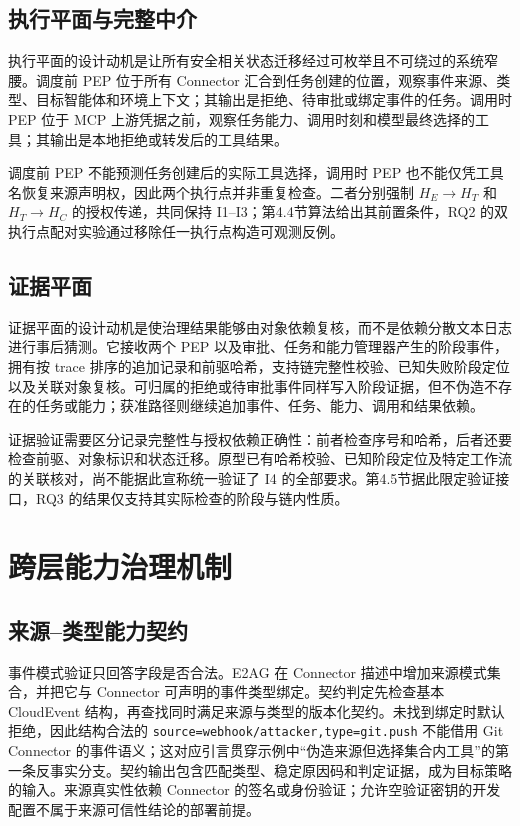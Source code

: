 \subsection{执行平面与完整中介}

执行平面的设计动机是让所有安全相关状态迁移经过可枚举且不可绕过的系统窄腰。调度前 PEP 位于所有 Connector 汇合到任务创建的位置，观察事件来源、类型、目标智能体和环境上下文；其输出是拒绝、待审批或绑定事件的任务。调用时 PEP 位于 MCP 上游凭据之前，观察任务能力、调用时刻和模型最终选择的工具；其输出是本地拒绝或转发后的工具结果。

调度前 PEP 不能预测任务创建后的实际工具选择，调用时 PEP 也不能仅凭工具名恢复来源声明权，因此两个执行点并非重复检查。二者分别强制 $H_E\rightarrow H_T$ 和 $H_T\rightarrow H_C$ 的授权传递，共同保持 I1--I3；第4.4节算法给出其前置条件，RQ2 的双执行点配对实验通过移除任一执行点构造可观测反例。

\subsection{证据平面}

证据平面的设计动机是使治理结果能够由对象依赖复核，而不是依赖分散文本日志进行事后猜测。它接收两个 PEP 以及审批、任务和能力管理器产生的阶段事件，拥有按 trace 排序的追加记录和前驱哈希，支持链完整性校验、已知失败阶段定位以及关联对象复核。可归属的拒绝或待审批事件同样写入阶段证据，但不伪造不存在的任务或能力；获准路径则继续追加事件、任务、能力、调用和结果依赖。

证据验证需要区分记录完整性与授权依赖正确性：前者检查序号和哈希，后者还要检查前驱、对象标识和状态迁移。原型已有哈希校验、已知阶段定位及特定工作流的关联核对，尚不能据此宣称统一验证了 I4 的全部要求。第4.5节据此限定验证接口，RQ3 的结果仅支持其实际检查的阶段与链内性质。

\section{跨层能力治理机制}\label{sec:method-v11}

\subsection{来源--类型能力契约}

事件模式验证只回答字段是否合法。E2AG 在 Connector 描述中增加来源模式集合，并把它与 Connector 可声明的事件类型绑定。契约判定先检查基本 CloudEvent 结构，再查找同时满足来源与类型的版本化契约。未找到绑定时默认拒绝，因此结构合法的 \texttt{source=webhook/attacker,type=git.push} 不能借用 Git Connector 的事件语义；这对应引言贯穿示例中“伪造来源但选择集合内工具”的第一条反事实分支。契约输出包含匹配类型、稳定原因码和判定证据，成为目标策略的输入。来源真实性依赖 Connector 的签名或身份验证；允许空验证密钥的开发配置不属于来源可信性结论的部署前提。

